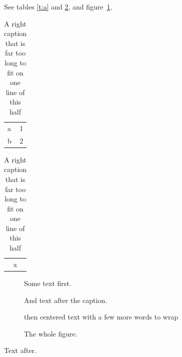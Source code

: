\documentclass{article}
\begin{document}
See tables \ref{t:a} and \ref{t:b}, and figure~\ref{f:c}.

\begin{table}[h]
\centering
\begin{minipage}{0.45\linewidth}
\centering
\begin{tabular}{lr}
a & 1 \\
b & 2
\end{tabular}
\caption{Left.}
\label{t:a}
\end{minipage}\hfill
\begin{minipage}{0.45\linewidth}
\centering
\caption{A right caption that is far too long to fit on one line of this half}
\label{t:b}
\begin{tabular}{c}
x
\end{tabular}
\end{minipage}
\end{table}

\begin{figure}[h]
\begin{minipage}[t]{5cm}
Some text first.
\caption{Below text.}\label{f:c}
And text after the caption.
\end{minipage}
\begin{minipage}[t]{4cm}
\caption{First.}
\centering
then centered text with a few more words to wrap
\end{minipage}
\caption{The whole figure.}
\end{figure}

Text after.
\end{document}
